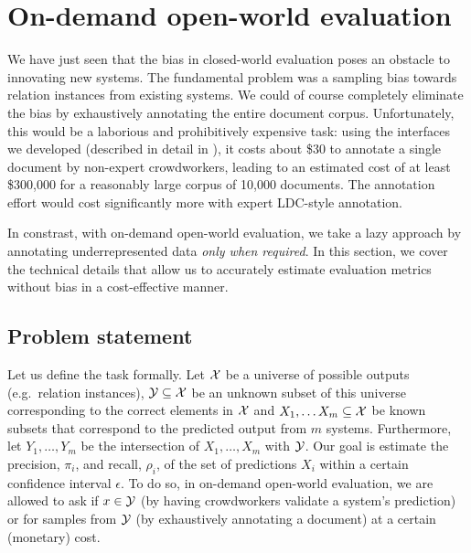 \section{On-demand open-world evaluation}
\label{sec:methodology}

We have just seen that the bias in closed-world evaluation poses an obstacle to innovating new systems.
The fundamental problem was a sampling bias towards relation instances from existing systems.
We could of course completely eliminate the bias by exhaustively annotating the entire document corpus.
Unfortunately, this would be a laborious and prohibitively expensive task:
  using the interfaces we developed (described in detail in ), it costs about \$30 to annotate a single document by non-expert crowdworkers, leading to an estimated cost of at least \$300,000 for a reasonably large corpus of 10,000 documents.
The annotation effort would cost significantly more with expert LDC-style annotation.

In constrast, with on-demand open-world evaluation, we take a lazy approach by annotating underrepresented data \textit{only when required}.
In this section, we cover the technical details that allow us to accurately estimate evaluation metrics without bias in a cost-effective manner. 


\subsection{Problem statement}

Let us define the task formally.
Let $\mathcal{X}$ be a universe of possible outputs (e.g.\ relation instances),
  $\mathcal{Y} \subseteq \mathcal{X}$ be an unknown subset of this universe corresponding to the correct elements in $\mathcal{X}$ and
  $X_1, \ldots X_m \subseteq \mathcal{X}$ be known subsets that correspond to the predicted output from $m$ systems.
Furthermore, let $Y_1, \ldots, Y_m$ be the intersection of $X_1, \ldots, X_m$ with $\mathcal{Y}$.
Our goal is estimate the precision, $\pi_i$, and recall, $\rho_i$, of the set of predictions $X_i$ within a certain confidence interval $\epsilon$.
To do so, in on-demand open-world evaluation, we are allowed to ask if $x \in \mathcal{Y}$ (by having crowdworkers validate a system's prediction) or for samples from $\mathcal{Y}$ (by exhaustively annotating a document) at a certain (monetary) cost.

